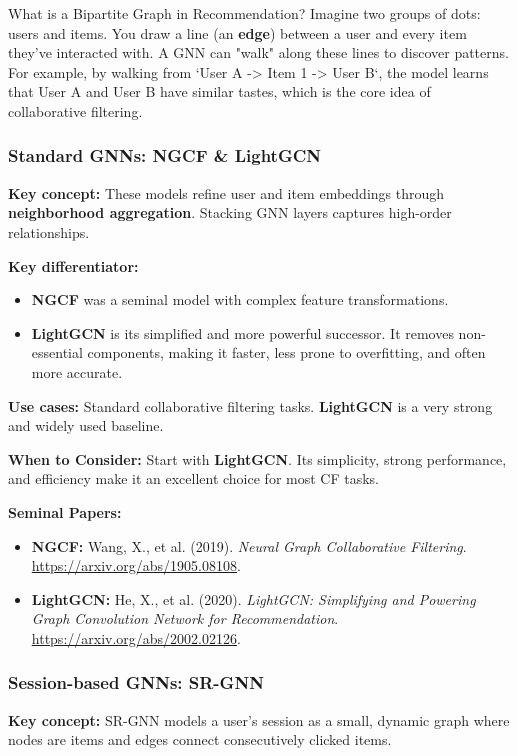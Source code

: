 \documentclass{article}
\begin{document}
    \begin{asidebox}{What is a Bipartite Graph in Recommendation?}
    Imagine two groups of dots: users and items. You draw a line (an \textbf{edge}) between a user and every item they've interacted with. A GNN can "walk" along these lines to discover patterns. For example, by walking from `User A -> Item 1 -> User B`, the model learns that User A and User B have similar tastes, which is the core idea of collaborative filtering.
    \end{asidebox}

    \subsubsection{Standard GNNs: NGCF \& LightGCN}
\noindent\textbf{Key concept:} These models refine user and item embeddings through \textbf{neighborhood aggregation}. Stacking GNN layers captures high-order relationships.

\noindent\textbf{Key differentiator:}
    \begin{itemize}
        \item \textbf{NGCF} was a seminal model with complex feature transformations.
        \item \textbf{LightGCN} is its simplified and more powerful successor. It removes non-essential components, making it faster, less prone to overfitting, and often more accurate.
    \end{itemize}
\noindent\textbf{Use cases:} Standard collaborative filtering tasks. \textbf{LightGCN} is a very strong and widely used baseline.

\noindent\textbf{When to Consider:} Start with \textbf{LightGCN}. Its simplicity, strong performance, and efficiency make it an excellent choice for most CF tasks.

\noindent\textbf{Seminal Papers:}
    \begin{itemize}
        \item \textbf{NGCF:} Wang, X., et al. (2019). \textit{Neural Graph Collaborative Filtering}. \url{https://arxiv.org/abs/1905.08108}.
        \item \textbf{LightGCN:} He, X., et al. (2020). \textit{LightGCN: Simplifying and Powering Graph Convolution Network for Recommendation}. \url{https://arxiv.org/abs/2002.02126}.
    \end{itemize}

    \subsubsection{Session-based GNNs: SR-GNN}
\noindent\textbf{Key concept:} SR-GNN models a user's session as a small, dynamic graph where nodes are items and edges connect consecutively clicked items.
\end{document}
